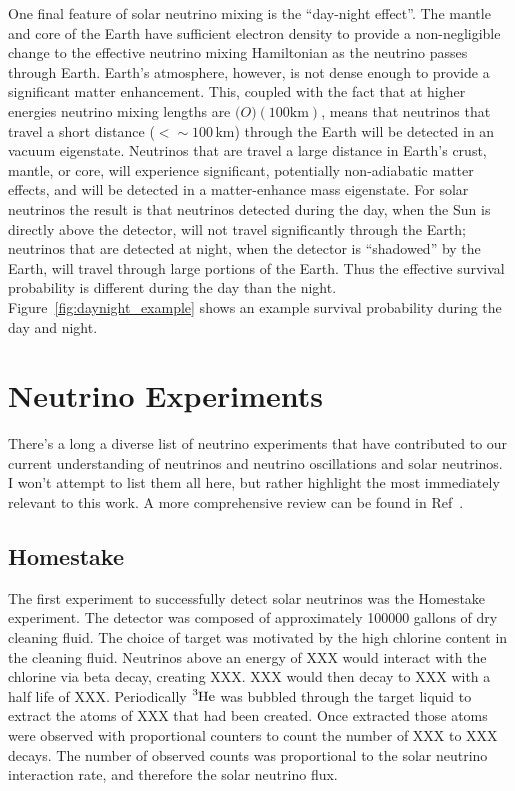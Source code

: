 One final feature of solar neutrino mixing is the ``day-night effect''.
The mantle and core of the Earth have sufficient electron density to provide
a non-negligible change to the effective neutrino mixing Hamiltonian as the neutrino
passes through Earth.
Earth's atmosphere, however, is not dense enough to provide a significant
matter enhancement.
This, coupled with the fact that at higher energies neutrino mixing lengths
are $\mathcal(O)(100\mathrm{ km})$, means that neutrinos that travel a short
distance ($<\sim100$\,km) through the Earth will be detected in an
vacuum eigenstate.
Neutrinos that are travel a large distance in Earth's crust, mantle, or core,
will experience significant, potentially non-adiabatic matter effects, and will
be detected in a matter-enhance mass eigenstate.
For solar neutrinos the result is that neutrinos detected during the day, when
the Sun is directly above the detector, will not travel significantly through
the Earth;
neutrinos that are detected at night, when the detector is ``shadowed'' by the
Earth, will travel through large portions of the Earth.
Thus the effective survival probability is different during the day than the night.
Figure~\ref{fig:daynight_example} shows an example survival probability during
the day and night.


\section{Neutrino Experiments}
\label{sec:experiments}
There's a long a diverse list of neutrino experiments that have contributed to
our current understanding of neutrinos and neutrino oscillations and solar neutrinos.
I won't attempt to list them all here, but rather highlight the most immediately
relevant to this work. A more comprehensive review can be found in Ref~\citep{giuntikim}.

\subsection{Homestake}
The first experiment to successfully detect solar neutrinos was the Homestake
experiment.
The detector was composed of approximately 100000 gallons of dry cleaning fluid.
The choice of target was motivated by the high chlorine content in the cleaning
fluid. Neutrinos above an energy of XXX would interact with the chlorine via
beta decay, creating XXX. XXX would then decay to XXX with a half life of XXX.
Periodically $\ce{^{3}He}$ was bubbled through the
target liquid to extract the atoms of XXX that had been created. Once
extracted those atoms were observed with proportional counters to count the
number of XXX to XXX decays. The number of observed counts was proportional
to the solar neutrino interaction rate, and therefore the solar neutrino flux.

